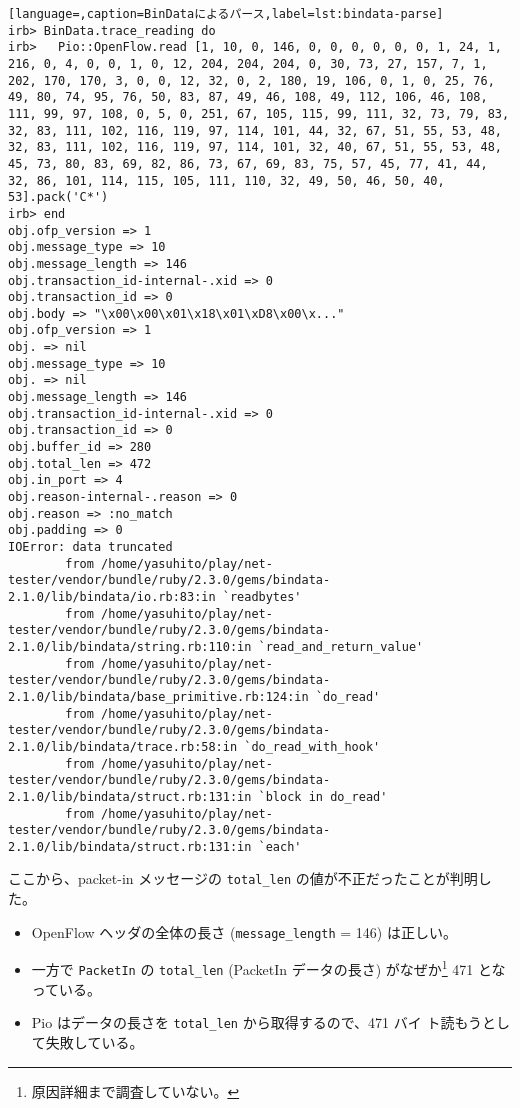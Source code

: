 \begin{lstlisting}[language=,caption=BinDataによるパース,label=lst:bindata-parse]
irb> BinData.trace_reading do
irb>   Pio::OpenFlow.read [1, 10, 0, 146, 0, 0, 0, 0, 0, 0, 1, 24, 1, 216, 0, 4, 0, 0, 1, 0, 12, 204, 204, 204, 0, 30, 73, 27, 157, 7, 1, 202, 170, 170, 3, 0, 0, 12, 32, 0, 2, 180, 19, 106, 0, 1, 0, 25, 76, 49, 80, 74, 95, 76, 50, 83, 87, 49, 46, 108, 49, 112, 106, 46, 108, 111, 99, 97, 108, 0, 5, 0, 251, 67, 105, 115, 99, 111, 32, 73, 79, 83, 32, 83, 111, 102, 116, 119, 97, 114, 101, 44, 32, 67, 51, 55, 53, 48, 32, 83, 111, 102, 116, 119, 97, 114, 101, 32, 40, 67, 51, 55, 53, 48, 45, 73, 80, 83, 69, 82, 86, 73, 67, 69, 83, 75, 57, 45, 77, 41, 44, 32, 86, 101, 114, 115, 105, 111, 110, 32, 49, 50, 46, 50, 40, 53].pack('C*')
irb> end
obj.ofp_version => 1
obj.message_type => 10
obj.message_length => 146
obj.transaction_id-internal-.xid => 0
obj.transaction_id => 0
obj.body => "\x00\x00\x01\x18\x01\xD8\x00\x..."
obj.ofp_version => 1
obj. => nil
obj.message_type => 10
obj. => nil
obj.message_length => 146
obj.transaction_id-internal-.xid => 0
obj.transaction_id => 0
obj.buffer_id => 280
obj.total_len => 472
obj.in_port => 4
obj.reason-internal-.reason => 0
obj.reason => :no_match
obj.padding => 0
IOError: data truncated
        from /home/yasuhito/play/net-tester/vendor/bundle/ruby/2.3.0/gems/bindata-2.1.0/lib/bindata/io.rb:83:in `readbytes'
        from /home/yasuhito/play/net-tester/vendor/bundle/ruby/2.3.0/gems/bindata-2.1.0/lib/bindata/string.rb:110:in `read_and_return_value'
        from /home/yasuhito/play/net-tester/vendor/bundle/ruby/2.3.0/gems/bindata-2.1.0/lib/bindata/base_primitive.rb:124:in `do_read'
        from /home/yasuhito/play/net-tester/vendor/bundle/ruby/2.3.0/gems/bindata-2.1.0/lib/bindata/trace.rb:58:in `do_read_with_hook'
        from /home/yasuhito/play/net-tester/vendor/bundle/ruby/2.3.0/gems/bindata-2.1.0/lib/bindata/struct.rb:131:in `block in do_read'
        from /home/yasuhito/play/net-tester/vendor/bundle/ruby/2.3.0/gems/bindata-2.1.0/lib/bindata/struct.rb:131:in `each'
\end{lstlisting}

ここから、packet-in メッセージの \verb|total_len| の値が不正だったことが判明した。
\begin{itemize}
 \item OpenFlow ヘッダの全体の長さ (\verb|message_length| = 146) は正しい。
 \item 一方で \verb|PacketIn| の \verb|total_len| (PacketIn データの長さ)
       がなぜか\footnote{原因詳細まで調査していない。} 471 となっている。
 \item Pio はデータの長さを \verb|total_len| から取得するので、471 バイ
       ト読もうとして失敗している。
\end{itemize}

